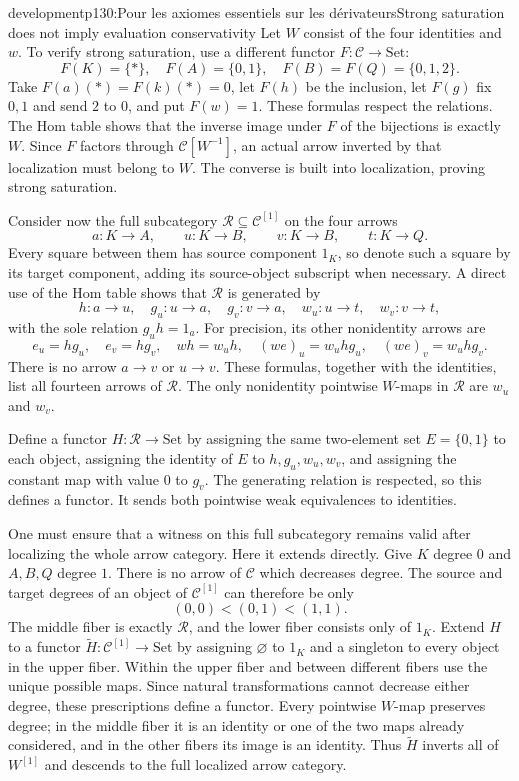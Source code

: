 \begin{dcomment}{development}{p130:Pour les axiomes essentiels sur les dérivateurs}{Strong saturation does not imply evaluation conservativity}
Let $W$ consist of the four identities and $w$. To verify strong saturation, use a different functor $F:\mathcal C\to\mathrm{Set}$:
\[
F(K)=\{*\},\quad F(A)=\{0,1\},\quad
F(B)=F(Q)=\{0,1,2\}.
\]
Take $F(a)(*)=F(k)(*)=0$, let $F(h)$ be the inclusion, let $F(g)$ fix $0,1$ and send $2$ to $0$, and put $F(w)=1$. These formulas respect the relations. The Hom table shows that the inverse image under $F$ of the bijections is exactly $W$. Since $F$ factors through $\mathcal C[W^{-1}]$, an actual arrow inverted by that localization must belong to $W$. The converse is built into localization, proving strong saturation.

Consider now the full subcategory $\mathcal R\subseteq\mathcal C^{[1]}$ on the four arrows
\[
a:K\to A,\qquad u:K\to B,\qquad
v:K\to B,\qquad t:K\to Q.
\]
Every square between them has source component $1_K$, so denote such a square by its target component, adding its source-object subscript when necessary. A direct use of the Hom table shows that $\mathcal R$ is generated by
\[
h:a\to u,\quad g_u:u\to a,\quad g_v:v\to a,
\quad w_u:u\to t,\quad w_v:v\to t,
\]
with the sole relation $g_uh=1_a$. For precision, its other nonidentity arrows are
\[
e_u=hg_u,\quad e_v=hg_v,\quad
wh=w_uh,\quad (we)_u=w_uhg_u,\quad (we)_v=w_uhg_v.
\]
There is no arrow $a\to v$ or $u\to v$. These formulas, together with the identities, list all fourteen arrows of $\mathcal R$. The only nonidentity pointwise $W$-maps in $\mathcal R$ are $w_u$ and $w_v$.

Define a functor $H:\mathcal R\to\mathrm{Set}$ by assigning the same two-element set $E=\{0,1\}$ to each object, assigning the identity of $E$ to $h,g_u,w_u,w_v$, and assigning the constant map with value $0$ to $g_v$. The generating relation is respected, so this defines a functor. It sends both pointwise weak equivalences to identities.

One must ensure that a witness on this full subcategory remains valid after localizing the whole arrow category. Here it extends directly. Give $K$ degree $0$ and $A,B,Q$ degree $1$. There is no arrow of $\mathcal C$ which decreases degree. The source and target degrees of an object of $\mathcal C^{[1]}$ can therefore be only
\[
(0,0)<(0,1)<(1,1).
\]
The middle fiber is exactly $\mathcal R$, and the lower fiber consists only of $1_K$. Extend $H$ to a functor $\widetilde H:\mathcal C^{[1]}\to\mathrm{Set}$ by assigning $\varnothing$ to $1_K$ and a singleton to every object in the upper fiber. Within the upper fiber and between different fibers use the unique possible maps. Since natural transformations cannot decrease either degree, these prescriptions define a functor. Every pointwise $W$-map preserves degree; in the middle fiber it is an identity or one of the two maps already considered, and in the other fibers its image is an identity. Thus $\widetilde H$ inverts all of $W^{[1]}$ and descends to the full localized arrow category.


\end{dcomment}
